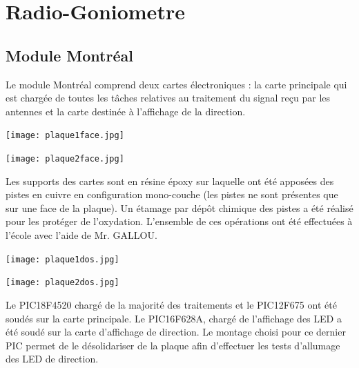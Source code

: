 
\chapter{Radio-Goniometre}

 
\section{Module Montréal}

Le module Montréal comprend deux cartes électroniques : la carte principale qui est chargée de toutes les tâches relatives au traitement du signal reçu par les antennes et la carte destinée à l'affichage de la direction.
~\\

\begin{minipage}{0.45\linewidth}

  \centering
  \texttt{[image: plaque1face.jpg]}
  ~\\
\end{minipage}
\begin{minipage}{0.45\linewidth}
	  \centering
  \texttt{[image: plaque2face.jpg]}
  ~\\
\end{minipage}


Les supports des cartes sont en résine époxy sur laquelle ont été apposées des pistes en cuivre en configuration mono-couche (les pistes ne sont présentes que sur une face de la plaque). Un étamage par dépôt chimique des pistes a été réalisé pour les protéger de l'oxydation. L'ensemble de ces opérations ont été effectuées à l'école avec l'aide de Mr. GALLOU.
~\\
\begin{minipage}{0.45\linewidth}

  \centering
  \texttt{[image: plaque1dos.jpg]}
  ~\\
\end{minipage}
\begin{minipage}{0.45\linewidth}
	  \centering
  \texttt{[image: plaque2dos.jpg]}
  ~\\
\end{minipage}
 
Le PIC18F4520 chargé de la majorité des traitements et le PIC12F675 ont été soudés sur la carte principale. Le PIC16F628A, chargé de l'affichage des LED a été soudé sur la carte d'affichage de direction. Le montage choisi pour ce dernier PIC permet de le désolidariser de la plaque afin d'effectuer les tests d'allumage des LED de direction.

